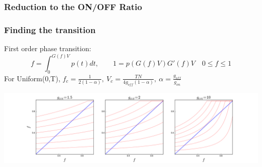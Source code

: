 \documentclass[mathserif]{beamer}
\begin{document}
\begin{frame}
\frametitle{Reduction to the ON/OFF Ratio}
\begin{center}



\end{center}
\end{frame}


\begin{frame}
\frametitle{Finding the transition}
First order phase transition:
$$f = \int_0^{G(f)V} p(t) dt,  \quad\quad 1 = p(G(f)V)G'(f)V \quad 0 \le f \le 1$$
For Uniform(0,T),
$f_c = \frac{1}{2(1-\alpha)}, \: V_c = \frac{TN}{4g_{off}(1-\alpha)},
 \: \alpha = \frac{g_{off}}{g_{on}}$

\vspace{0.25in}
\centering
\includegraphics[width=1.1\textwidth]{SC_1D_Uniform01.png}

\end{frame}
\end{document}
